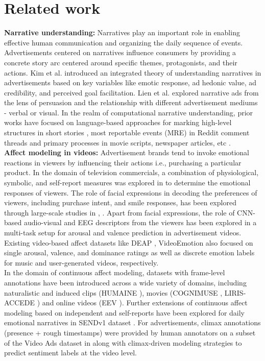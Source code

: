 \section{Related work}
\textbf{Narrative understanding:} 
Narratives \cite{Fisher1987HumanCA} play an important role in enabling effective human communication and organizing the daily sequence of events. Advertisements centered on narratives \cite{Escalas1998ADVERTISINGNW} influence consumers by providing a concrete story arc centered around specific themes, protagonists, and their actions. Kim et al. \cite{Kim2017WhyNA} introduced an integrated theory of understanding narratives in advertisements based on key variables like emotic response, ad hedonic value, ad credibility, and perceived goal facilitation. Lien et al. \cite{Lien2013NarrativeAT} explored narrative ads from the lens of persuasion and the relationship with different advertisement mediums - verbal or visual. In the realm of computational narrative understanding, prior works have focused on language-based approaches for marking high-level structures in short stories \cite{Li2017AnnotatingHS}, most reportable events (MRE) in Reddit comment threads \cite{Ouyang2015ModelingRE} and primary processes in movie scripts, newspaper articles, etc \cite{Boyd2020TheNA}.\\
\textbf{Affect modeling in videos:}
Advertisement brands tend to invoke emotional reactions \cite{Holbrook1984TheRO} in viewers by influencing their actions i.e., purchasing a particular product. In the domain of television commercials, a combination of physiological, symbolic, and self-report measures was explored in \cite{Micu2010MeasurableEH} to determine the emotional responses of viewers. The role of facial expressions in decoding the preferences of viewers, including purchase intent, and smile responses, has been explored through large-scale studies in \cite{McDuff2014PredictingAL}, \cite{Teixeira2014WhyWA}. Apart from facial expressions, the role of CNN-based audio-visual and EEG descriptors from the viewers has been explored in a multi-task setup \cite{Shukla2017AffectRI,Shukla2017EvaluatingCV,Shukla2019RecognitionOA} for arousal and valence prediction in advertisement videos. Existing video-based affect datasets like DEAP \cite{Koelstra2012DEAPAD}, VideoEmotion \cite{Jiang2014PredictingEI} also focused on single arousal, valence, and dominance ratings as well as discrete emotion labels for music and user-generated videos, respectively.\\
In the domain of continuous affect modeling, datasets with frame-level annotations have been introduced across a wide variety of domains, including naturalistic and induced clips (HUMAINE \cite{DouglasCowie2007TheHD}), movies (COGNIMUSE \cite{Zlatintsi2017COGNIMUSEAM}, LIRIS-ACCEDE \cite{Baveye2015LIRISACCEDEAV}) and online videos (EEV \cite{Sun2020EEVDP}). Further extensions of continuous affect modeling based on independent and self-reports have been explored for daily emotional narratives in SENDv1 dataset \cite{Ong2019ModelingEI}. For advertisements, climax annotations (presence + rough timestamps) were provided by human annotators on a subset of the Video Ads dataset \cite{Hussain2017AutomaticUO} in \cite{Ye2018StoryUI} along with climax-driven modeling strategies to predict sentiment labels at the video level. 
